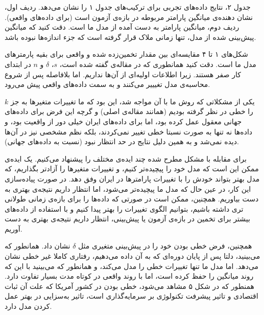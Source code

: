 \documentclass[11pt, fleqn]{article}
\begin{document}
\begin{multicols}{2}
 
جدول ۲، نتایج داده‌های تجربی برای ترکیب‌های جدول ۱ را نشان می‌دهد. ردیف اول، نشان دهنده‌ی میانگین پارامتر مربوطه در بازه‌ی آزمون است (برای داده‌های واقعی). ردیف دوم، میانگین پارامتر به دست آمده از مدل ما است. دقت کنید که میانگین پیش‌بینی شده از مدل، تنها زمانی ملاک قرار گرفته است که جزء اندازه‌ها نبوده باشد.


شکل‌های ۱ تا ۴ مقایسه‌ای بین مقدار تخمین‌زده شده و واقعی برای بقیه پارمتر‌های مدل ما است. دقت کنید  همانطوری که در مقاله‌ی
\cite{main}
  گفته شده است، $s$، 
  $\delta$
   و
   $n$
    در ابتدای کار صفر هستند. زیرا اطلاعات اولیه‌ای از آن‌ها نداریم. اما بلافاصله پس از شروع محاسبه‌ی مدل تغیییر می‌کنند و به سمت داده‌های واقعی پیش می‌رود.
    





یکی از مشکلاتی که روش ما با آن مواجه شد، این بود که ما تغییرات متغیر‌ها به جز 
$k$
 را خطی در نظر گرفته بودیم (همانند مقاله‌ی اصلی) و گرچه این فرض برای داده‌های جهانی معقول عمل کرده بود، اما برای داده‌های ایران خیلی دور از واقعیت بود، و داده‌ها نه تنها به صورت نسبتا خطی تغییر نمی‌کردند، بلکه نظم مشخصی نیز در آن‌ها دیده نمی‌شد و به همین دلیل نتایج در حد انتظار نبود (نسبت به داده‌های جهانی).


برای مقابله با مشکل مطرح شده چند ایده‌ی مختلف را پیشنهاد می‌کنیم. یک ایده‌ی ممکن این است که مدل خود را پیچیده‌تر کنیم، و تغییرات متغیر‌ها را آزادتر بگذاریم، که مدل بهتر بتواند خودش را با تغییرات پارامتر‌ها در ایران وفق دهد. در صورت پیاده‌سازی این کار، در عین حال که مدل ما پیچیده‌تر می‌شود، اما انتظار داریم نتیجه‌ی بهتری به دست بیاوریم. همچنین، ممکن است در صورتی که داده‌ها را برای بازه‌ی زمانی طولانی تری داشته باشیم، بتوانیم الگوی تغییرات را بهتر پیدا کنیم و با استفاده از داده‌های بیشتر برای تخمین در بازه‌ی آزمون یا پیش‌بینی، انتظار داریم نتیجه‌ی بهتری به دست آوریم. 


همچنین، فرض خطی بودن خود را در پیش‌بینی متغیری مثل
$\delta$
نشان داد. همانطور که می‌بینید، دلتا پس از پایان دوره‌ای که به آن داده می‌دهیم، رفتاری کاملا غیر خطی نشان می‌دهد. اما مدل ما تنها تغییرات خطی را مدل می‌کند، و همانطور که می‌بینید با این که روند میانگین را حفظ کرده است، اما با روند واقعی در کوتاه مدت بسیار تفاوت دارد. همنطور که در شکل ۵
مشاهد می‌شود،
 خطی بودن 
\lr{$\delta$}
 در کشور آمریکا که علت آن ثبات اقتصادی و تاثیر پیشرفت تکنولوژی بر سرمایه‌گذاری است، تاثیر به‌سزایی در بهتر عمل کردن مدل دارد.


\end{multicols}
\end{document}
